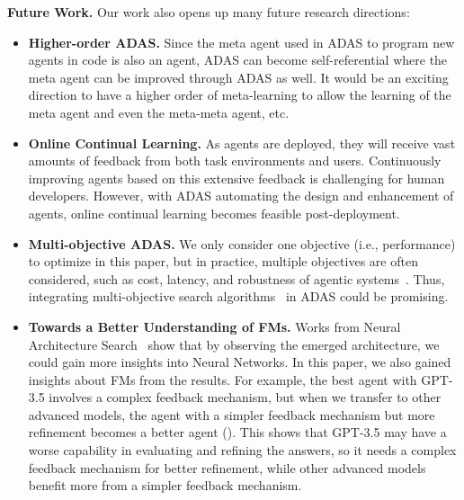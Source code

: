 \documentclass{article} %
\newcommand{\problem}{ADAS\xspace}
\begin{document}
\noindent\textbf{Future Work.}\hspace{0.5em} Our work also opens up many future research directions:
\begin{itemize}[label=\large\textbullet, left=0pt]

\item \noindent\textbf{Higher-order \problem.}\hspace{0.2em} Since the meta agent used in \problem to program new agents in code is also an agent, \problem can become self-referential where the meta agent can be improved through \problem as well. It would be an exciting direction to have a higher order of meta-learning to allow the learning of the meta agent and even the meta-meta agent, etc.~\citep{lu2023arbitrary,schmidhuber:1987:srl,schmidhuber2003godel,zelikman2024self}

\item \noindent\textbf{Online Continual Learning.}\hspace{0.3em} As agents are deployed, they will receive vast amounts of feedback from both task environments and users. Continuously improving agents based on this extensive feedback is challenging for human developers. However, with ADAS automating the design and enhancement of agents, online continual learning becomes feasible post-deployment.

\item \noindent\textbf{Multi-objective \problem.}\hspace{0.3em} We only consider one objective (i.e., performance) to optimize in this paper, but in practice, multiple objectives are often considered, such as cost, latency, and robustness of agentic systems~\citep{hu2021accelerating,huang2023revisiting}. Thus, integrating multi-objective search algorithms~\citep{deb2002fast} in \problem could be promising.

\item \noindent\textbf{Towards a Better Understanding of FMs.}\hspace{0.3em}  Works from Neural Architecture Search~\citep{huang2023revisiting} show that by observing the emerged architecture, we could gain more insights into Neural Networks. In this paper, we also gained insights about FMs from the results. For example, the best agent with GPT-3.5 involves a complex feedback mechanism, but when we transfer to other advanced models, the agent with a simpler feedback mechanism but more refinement becomes a better agent (). This shows that GPT-3.5 may have a worse capability in evaluating and refining the answers, so it needs a complex feedback mechanism for better refinement, while other advanced models benefit more from a simpler feedback mechanism.


\end{itemize}
\end{document}
